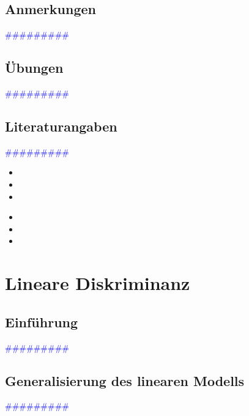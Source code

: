 \documentclass{article}
\begin{document}
  \subsection{Anmerkungen} %
      \textcolor{blue}{\#\#\#\#\#\#\#\#\#}
  \subsection{Übungen} %
      \textcolor{blue}{\#\#\#\#\#\#\#\#\#}
  \subsection{Literaturangaben} %
      \textcolor{blue}{\#\#\#\#\#\#\#\#\#}

      \begin{itemize}
      \color{red}
        \item
        \item
        \item
      \end{itemize}


      \begin{itemize}
      \color{ForestGreen}
        \item
        \item
        \item
      \end{itemize}




\newpage
\section{Lineare Diskriminanz} %
  \subsection{Einführung} %
      \textcolor{blue}{\#\#\#\#\#\#\#\#\#}
  \subsection{Generalisierung des linearen Modells} %
      \textcolor{blue}{\#\#\#\#\#\#\#\#\#}
\end{document}
